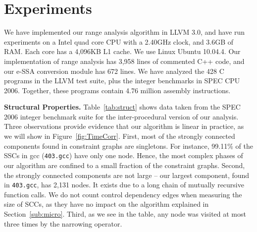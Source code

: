 \documentclass{llncs}
\begin{document}
\section{Experiments}
\label{sec:exp}

We have implemented our range analysis algorithm in LLVM 3.0, and have run
experiments on a Intel quad core CPU with a 2.40GHz clock, and 3.6GB of RAM.
Each core has a 4,096KB L1 cache.
We use Linux Ubuntu 10.04.4.
Our implementation of range analysis has 3,958 lines of
commented C++ code, and our e-SSA conversion module has 672 lines.
We have analyzed the 428 C programs in the LLVM test suite, plus the integer
benchmarks in SPEC CPU 2006.
Together, these programs contain 4.76 million assembly instructions.

\noindent
\textbf{Structural Properties.}
Table~\ref{tab:struct} shows data taken from the SPEC 2006 integer benchmark
suite for the inter-procedural version of our analysis.
Three observations provide evidence that our algorithm is linear in practice,
as we will show in Figure~\ref{fig:TimeCorr}.
First, most of the strongly connected components found in constraint graphs are
singletons.
For instance, 99.11\% of the SSCs in gcc (\texttt{403.gcc}) have only
one node.
Hence, the most complex phases of our algorithm are confined to a small fraction
of the constraint graphs.
Second, the strongly connected components are not large -- our largest
component, found in \texttt{403.gcc}, has 2,131 nodes.
It exists due to a long chain of mutually recursive function calls.
We do not count control dependency edges when measuring the size of SCCs, as
they have no impact on the algorithm explained in Section~\ref{sub:micro}.
Third, as we see in the table, any node was visited at most three times by
the narrowing operator.
\end{document}
